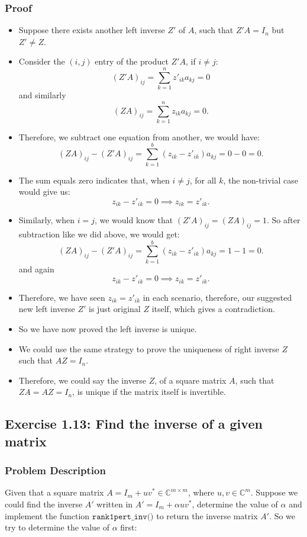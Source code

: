 \subsubsection*{Proof}
\begin{itemize}
  \item Suppose there exists another left inverse $Z'$ of $A$, such that  $Z'A = I_n$ but  $Z' \neq  Z$.
  \item Consider the $(i, j)$ entry of the product $Z'A$, if $i \neq j$:
    \[
      (Z'A)_{ij} = \sum_{k=1}^{n} z'_{ik}a_{kj} = 0
    \]
    and similarly
    \[
      (ZA)_{ij} = \sum_{k=1}^{n} z_{ik}a_{kj} = 0
    .\]
  \item Therefore, we subtract one equation from another, we would have:
    \[
      (ZA)_{ij} - (Z'A)_{ij} = \sum_{k=1}^{b} (z_{ik} - z'_{ik})a_{kj} = 0 - 0 = 0
    .\]
  \item The sum equals zero indicates that, when $i \neq  j$, for all $k$, the non-trivial case would give us:
     \[
    z_{ik} - z'_{ik} = 0 \implies z_{ik} = z'_{ik}
    .\] 
  \item Similarly, when $i = j$, we would know that  $(Z'A)_{ij} = (ZA)_{ij} = 1$. So after subtraction like we did above, we would get:
    \[
      (ZA)_{ij} - (Z'A)_{ij} = \sum_{k=1}^{b} (z_{ik} - z'_{ik})a_{kj} = 1 - 1 = 0
    .\]
    and again
    \[
    z_{ik} - z'_{ik} = 0 \implies z_{ik} = z'_{ik}
    .\] 
  \item Therefore, we have seen $z_{ik} = z'_{ik}$ in each scenario, therefore, our suggested new left inverse $Z'$ is just original $Z$ itself, which gives a contradiction.
   \item So we have now proved the left inverse is unique.
  \item We could use the same strategy to prove the uniqueness of right inverse $Z$ such that  $AZ = I_n$.
  \item Therefore, we could say the inverse $Z$, of a square matrix $A$, such that  $ZA = AZ = I_n$, is unique if the matrix itself is invertible.
\end{itemize}
\subsection*{Exercise 1.13: Find the inverse of a given matrix}%
\subsubsection*{Problem Description}
Given that a square matrix $A = I_m + uv^{*} \in \mathbb{C}^{m \times m}$, where $u, v \in \mathbb{C}^{m}$. Suppose we could find the inverse $A'$ written in  $A' = I_m + \alpha uv^{*}$, determine the value of $\alpha$ and implement the function $\texttt{rank1pert\_inv()}$ to return the inverse matrix $A'$.
So we try to determine the value of $\alpha$ first:
